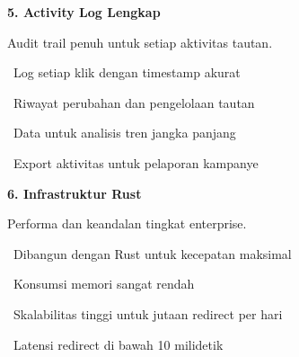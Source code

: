 \documentclass[a4paper]{article}
\begin{document}
\vspace{8pt}

\noindent
\begin{minipage}[t]{0.485\textwidth}
    \colorbox{OrangePrimary}{%
        \begin{minipage}{\dimexpr\textwidth-14pt}
            \vspace{5pt}
            {\fontsize{10}{13}\selectfont\bfseries\color{White} 5. Activity Log Lengkap}
            \vspace{5pt}
        \end{minipage}}
    \vspace{5pt}
    {\fontsize{9}{12}\selectfont\color{TextDark}%
    Audit trail penuh untuk setiap aktivitas tautan.\par\vspace{3pt}
    \textbullet\ Log setiap klik dengan timestamp akurat\par\vspace{2pt}%
    \textbullet\ Riwayat perubahan dan pengelolaan tautan\par\vspace{2pt}%
    \textbullet\ Data untuk analisis tren jangka panjang\par\vspace{2pt}%
    \textbullet\ Export aktivitas untuk pelaporan kampanye}%
\end{minipage}%
\hfill
\begin{minipage}[t]{0.485\textwidth}
    \colorbox{CyanDark}{%
        \begin{minipage}{\dimexpr\textwidth-14pt}
            \vspace{5pt}
            {\fontsize{10}{13}\selectfont\bfseries\color{White} 6. Infrastruktur Rust}
            \vspace{5pt}
        \end{minipage}}
    \vspace{5pt}
    {\fontsize{9}{12}\selectfont\color{TextDark}%
    Performa dan keandalan tingkat enterprise.\par\vspace{3pt}
    \textbullet\ Dibangun dengan Rust untuk kecepatan maksimal\par\vspace{2pt}%
    \textbullet\ Konsumsi memori sangat rendah\par\vspace{2pt}%
    \textbullet\ Skalabilitas tinggi untuk jutaan redirect per hari\par\vspace{2pt}%
    \textbullet\ Latensi redirect di bawah 10 milidetik}%
\end{minipage}
\end{document}
